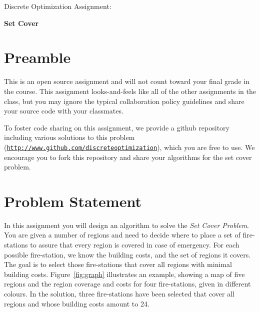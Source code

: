 \documentclass[11pt]{article}
\begin{document}
\huge
\noindent
{Discrete Optimization Assignment:}
\vspace{0.25cm}

\noindent
{\bf Set Cover}
\normalsize

\section{Preamble}

This is an open source assignment and will not count toward your final grade in the course.  This assignment looks-and-feels like all of the other assignments in the class, but you may ignore the typical collaboration policy guidelines and share your source code with your classmates.

To foster code sharing on this assignment, we provide a github repository including various solutions to this problem (\texttt{\url{http://www.github.com/discreteoptimization}}), which you are free to use.  We encourage you to fork this repository and share your algorithms for the set cover problem.

\section{Problem Statement}

In this assignment you will design an algorithm to solve the {\em Set Cover Problem}.
You are given a number of regions and need to decide where to place a set of fire-stations 
to assure that every region is covered in case of emergency.  
For each possible fire-station, we know the building costs, and the set of regions it covers.
The goal is to select those fire-stations that cover all regions with minimal building 
costs. Figure~\ref{fig:graph} illustrates an example, showing a map of five regions
and the region coverage and costs for four fire-stations, given in different colours.
In the solution, three fire-stations have been selected that cover all regions and 
whose building costs amount to 24.


\end{document}
